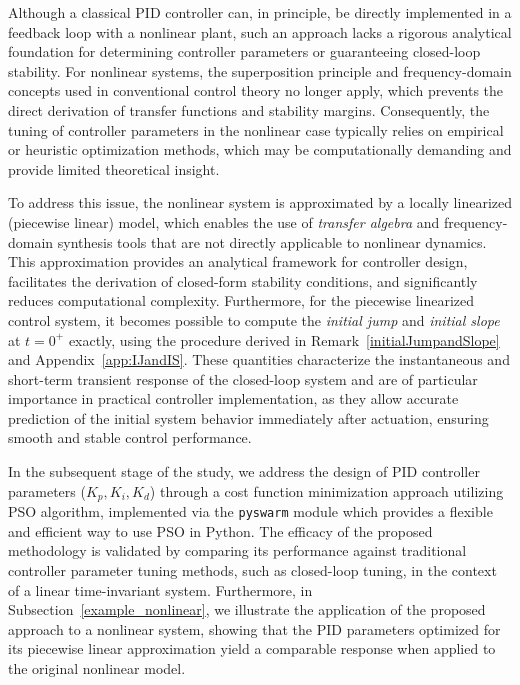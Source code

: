 \documentclass[preprint,12pt]{elsarticle}
\begin{document}
\begin{rem}
Although a classical PID controller can, in principle, be directly implemented in a feedback loop with a nonlinear plant, such an approach lacks a rigorous analytical foundation for determining controller parameters or guaranteeing closed-loop stability. For nonlinear systems, the superposition principle and frequency-domain concepts used in conventional control theory no longer apply, which prevents the direct derivation of transfer functions and stability margins. Consequently, the tuning of controller parameters in the nonlinear case typically relies on empirical or heuristic optimization methods, which may be computationally demanding and provide limited theoretical insight.

To address this issue, the nonlinear system is approximated by a locally linearized (piecewise linear) model, which enables the use of \emph{transfer algebra} and frequency-domain synthesis tools that are not directly applicable to nonlinear dynamics. This approximation provides an analytical framework for controller design, facilitates the derivation of closed-form stability conditions, and significantly reduces computational complexity. 
Furthermore, for the piecewise linearized control system, it becomes possible to compute the \emph{initial jump} and \emph{initial slope} at \(t = 0^+\) exactly, using the procedure derived in Remark~\ref{initialJumpandSlope} and Appendix~\ref{app:IJandIS}. These quantities characterize the instantaneous and short-term transient response of the closed-loop system and are of particular importance in practical controller implementation, as they allow accurate prediction of the initial system behavior immediately after actuation, ensuring smooth and stable control performance. 
\end{rem}

In the subsequent stage of the study, we address the design of PID controller parameters (\( K_p, K_i, K_d \)) through a cost function minimization approach utilizing PSO algorithm, implemented via the {\tt pyswarm} module which provides a flexible and efficient way to use PSO in Python. The efficacy of the proposed methodology is validated by comparing its performance against traditional controller parameter tuning methods, such as closed-loop tuning, in the context of a linear time-invariant system. Furthermore, in Subsection~\ref{example_nonlinear}, we illustrate the application of the proposed approach to a nonlinear system, showing that the PID parameters optimized for its piecewise linear approximation yield a comparable response when applied to the original nonlinear model.
\end{document}
